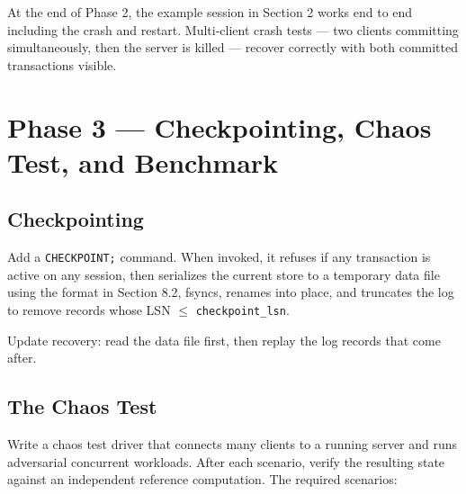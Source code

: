 \documentclass[11pt,a4paper]{article}
\begin{document}
At the end of Phase 2, the example session in Section 2 works end to end including the crash and restart. Multi-client crash tests --- two clients committing simultaneously, then the server is killed --- recover correctly with both committed transactions visible.

\section{Phase 3 --- Checkpointing, Chaos Test, and Benchmark}

\subsection{Checkpointing}
Add a \texttt{CHECKPOINT;} command. When invoked, it refuses if any transaction is active on any session, then serializes the current store to a temporary data file using the format in Section 8.2, fsyncs, renames into place, and truncates the log to remove records whose LSN $\leq$ \texttt{checkpoint\_lsn}.

Update recovery: read the data file first, then replay the log records that come after.

\subsection{The Chaos Test}
Write a chaos test driver that connects many clients to a running server and runs adversarial concurrent workloads. After each scenario, verify the resulting state against an independent reference computation. The required scenarios:
\end{document}
